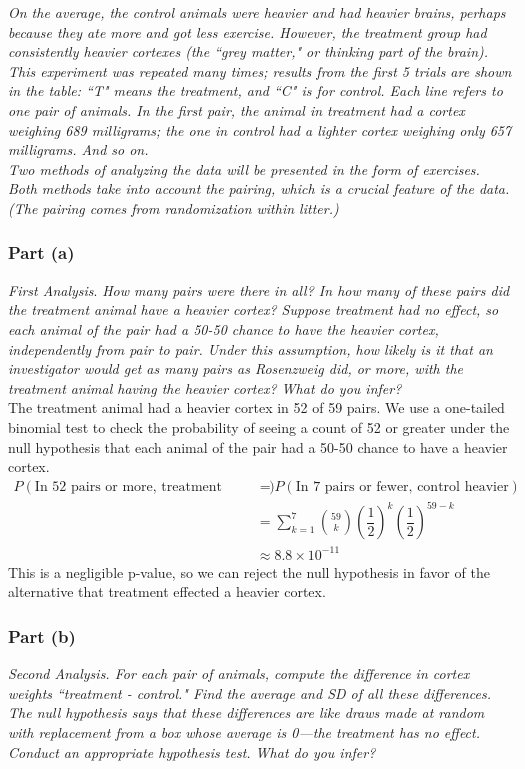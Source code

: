 \documentclass[11pt]{article}
\begin{document}
\noindent \emph{On the average, the control animals were heavier and had heavier brains, perhaps because they ate more and got less exercise. However, the treatment group had consistently heavier cortexes (the ``grey matter," or thinking part of the brain). This experiment was repeated many times; results from the first 5 trials are shown in the table: ``T" means the treatment, and ``C" is for control. Each line refers to one pair of animals. In the first pair, the animal in treatment had a cortex weighing 689 milligrams; the one in control had a lighter cortex weighing only 657 milligrams. And so on.}\\

\noindent \emph{Two methods of analyzing the data will be presented in the form of exercises. Both methods take into account the pairing, which is a crucial feature of the data. (The pairing comes from randomization within litter.)}

\subsubsection*{Part (a)}
\textit{First Analysis}.
\textit{ How many pairs were there in all?
In how many of these pairs did the treatment animal have a heavier cortex?
Suppose treatment had no effect, so each animal of the pair had a 50-50 chance to have the heavier cortex, independently from pair to pair.
Under this assumption, how likely is it that an investigator would get as many pairs as Rosenzweig did, or more, with the treatment animal having the heavier cortex?
What do you infer?}\\

The treatment animal had a heavier cortex in 52 of 59 pairs.  We use a one-tailed binomial test to check the probability of seeing a count of 52 or greater under the null hypothesis that each animal of the pair had a 50-50 chance to have a heavier cortex.
\begin{align*}
P(\text{In 52 pairs or more, treatment heavier}) &= P(\text{In 7 pairs or fewer, control heavier})\\
&= \sum_{k=1}^{7} \binom{59}{k} \left(\dfrac{1}{2}\right)^{k}\left(\dfrac{1}{2}\right)^{59-k} \\
&\approx 8.8 \times 10^{-11}
\end{align*}
This is a negligible p-value, so we can reject the null hypothesis in favor of the alternative that treatment effected a heavier cortex.

\subsubsection*{Part (b)}
\textit{Second Analysis.
For each pair of animals, compute the difference in cortex weights ``treatment - control."
Find the average and SD of all these differences.
The null hypothesis says that these differences are like draws made at random with replacement from a box whose average is 0---the treatment has no effect.
Conduct an appropriate hypothesis test.
What do you infer?}\\
\end{document}
